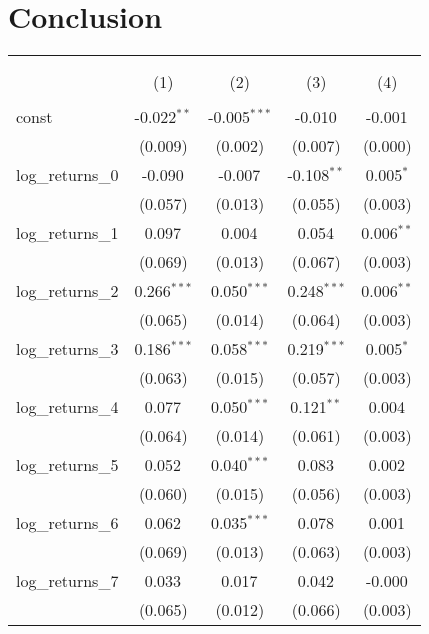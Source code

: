 \documentclass[12pt, letterpaper]{article}
\begin{document}
\section{Conclusion}


\begin{table}[H] 
    \begin{adjustbox}{width=\textwidth}
    \centering
    \begin{tabular}{@{\extracolsep{5pt}}lcccc}
    \\[-1.8ex]\hline
    \hline \\[-1.8ex]
    \\[-1.8ex] & (1) & (2) & (3) & (4) \\
    \hline \\[-1.8ex]
    const & -0.022$^{**}$ & -0.005$^{***}$ & -0.010$^{}$ & -0.001$^{}$ \\
    & (0.009) & (0.002) & (0.007) & (0.000) \\
    log\_returns\_0 & -0.090$^{}$ & -0.007$^{}$ & -0.108$^{**}$ & 0.005$^{*}$ \\
    & (0.057) & (0.013) & (0.055) & (0.003) \\
    log\_returns\_1 & 0.097$^{}$ & 0.004$^{}$ & 0.054$^{}$ & 0.006$^{**}$ \\
    & (0.069) & (0.013) & (0.067) & (0.003) \\
    log\_returns\_2 & 0.266$^{***}$ & 0.050$^{***}$ & 0.248$^{***}$ & 0.006$^{**}$ \\
    & (0.065) & (0.014) & (0.064) & (0.003) \\
    log\_returns\_3 & 0.186$^{***}$ & 0.058$^{***}$ & 0.219$^{***}$ & 0.005$^{*}$ \\
    & (0.063) & (0.015) & (0.057) & (0.003) \\
    log\_returns\_4 & 0.077$^{}$ & 0.050$^{***}$ & 0.121$^{**}$ & 0.004$^{}$ \\
    & (0.064) & (0.014) & (0.061) & (0.003) \\
    log\_returns\_5 & 0.052$^{}$ & 0.040$^{***}$ & 0.083$^{}$ & 0.002$^{}$ \\
    & (0.060) & (0.015) & (0.056) & (0.003) \\
    log\_returns\_6 & 0.062$^{}$ & 0.035$^{***}$ & 0.078$^{}$ & 0.001$^{}$ \\
    & (0.069) & (0.013) & (0.063) & (0.003) \\
    log\_returns\_7 & 0.033$^{}$ & 0.017$^{}$ & 0.042$^{}$ & -0.000$^{}$ \\
    & (0.065) & (0.012) & (0.066) & (0.003) \\

\end{tabular}
\end{adjustbox}
\end{table}
\end{document}

